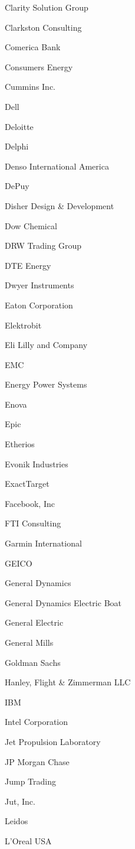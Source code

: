 \documentclass[twoside]{article}
\begin{document}
\begin{center}
\begin{multicols}{5}
\begin{FlushLeft}
\begin{compactitem}
\item Clarity Solution Group
\item Clarkston Consulting
\item Comerica Bank
\item Consumers Energy
\item Cummins Inc.
\item Dell
\item Deloitte
\item Delphi
\item Denso International America
\item DePuy
\item Disher Design \& Development
\item Dow Chemical
\item DRW Trading Group
\item DTE Energy
\item Dwyer Instruments
\item Eaton Corporation
\item Elektrobit
\item Eli Lilly and Company
\item EMC
\item Energy Power Systems
\item Enova
\item Epic
\item Etherios
\item Evonik Industries
\item ExactTarget
\item Facebook, Inc
\item FTI Consulting
\item Garmin International
\item GEICO
\item General Dynamics
\item General Dynamics Electric Boat
\item General Electric
\item General Mills
\item Goldman Sachs
\item Hanley, Flight \& Zimmerman LLC
\item IBM
\item Intel Corporation
\item Jet Propulsion Laboratory
\item JP Morgan Chase
\item Jump Trading
\item Jut, Inc.
\item Leidos
\item L'Oreal USA

\end{compactitem}
\end{FlushLeft}
\end{multicols}
\end{center}
\end{document}
